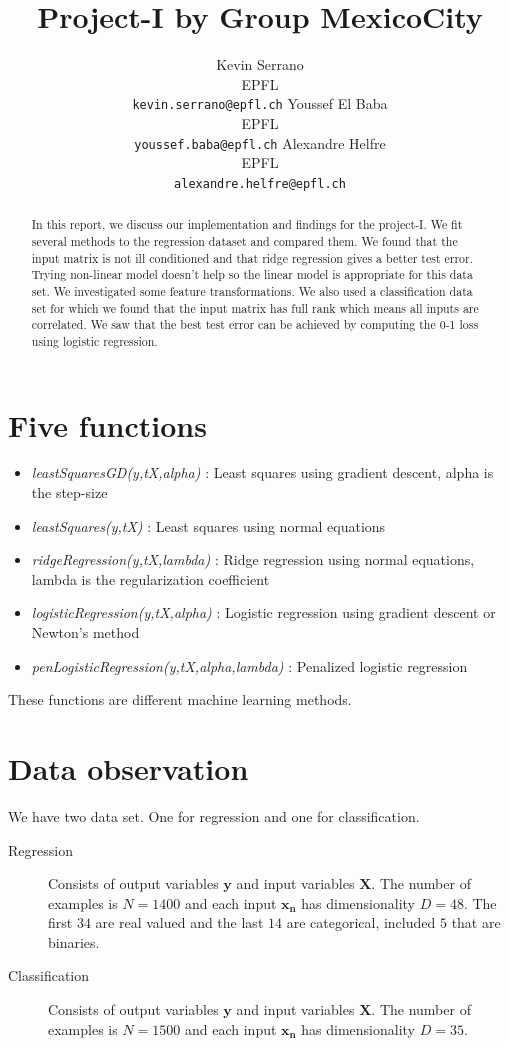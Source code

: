 \documentclass{article} %
\title{Project-I by Group MexicoCity}
\author{
Kevin Serrano\\EPFL\\
\texttt{kevin.serrano@epfl.ch} \And Youssef El Baba\\EPFL\\
\texttt{youssef.baba@epfl.ch} \And Alexandre Helfre\\EPFL\\
\texttt{alexandre.helfre@epfl.ch}
}
\begin{document}
\maketitle

\begin{abstract}
In this report, we discuss our implementation and findings for the project-I. We fit several methods to the regression dataset and compared them. We found that the input matrix is not ill conditioned and that ridge regression gives a better test error. Trying non-linear model doesn't help so the linear model is appropriate for this data set. We investigated some feature transformations. We also used a classification data set for which we found that the input matrix has full rank which means all inputs are correlated. We saw that the best test error can be achieved by computing the 0-1 loss using logistic regression.


\end{abstract}
\section{Five functions}
\begin{itemize}
\item \textit{leastSquaresGD(y,tX,alpha)} : Least squares using gradient descent, alpha is the step-size
\item \textit{leastSquares(y,tX)} : Least squares using normal equations
\item \textit{ridgeRegression(y,tX,lambda)} : Ridge regression using normal equations, lambda is the regularization coefficient
\item \textit{logisticRegression(y,tX,alpha)} : Logistic regression using gradient descent or Newton's method
\item \textit{penLogisticRegression(y,tX,alpha,lambda)} : Penalized logistic regression 

\end{itemize}
These functions are different machine learning methods.


\section{Data observation}
\label{sec:datadescr}
We have two data set. One for regression and one for classification. \begin{description}
\item[Regression] Consists of output variables $\mathbf{y}$ and input variables $\mathbf{X}$. The number of examples is $N = 1400$ and each input $\mathbf{x_n}$ has dimensionality $D = 48$. The first $34$ are real valued and the last $14$ are categorical, included $5$ that are binaries.
\item[Classification] Consists of output variables $\mathbf{y}$ and input variables $\mathbf{X}$. The number of examples is $N = 1500$ and each input $\mathbf{x_n}$ has dimensionality $D = 35$. 

\end{description}
\end{document}
